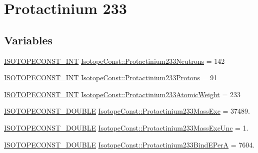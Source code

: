 \hypertarget{group___isotope_const-_protactinium-_pa233}{}\section{Protactinium 233}
\label{group___isotope_const-_protactinium-_pa233}
\subsection*{Variables}
\begin{DoxyCompactItemize}
\item 
\mbox{\hyperlink{group___isotope_const-_macros_ga5f18360b3e99483a35c32d789e62621c}{I\+S\+O\+T\+O\+P\+E\+C\+O\+N\+S\+T\+\_\+\+I\+NT}} \mbox{\hyperlink{group___isotope_const-_protactinium-_pa233_ga020b98acaa71450b29d8c4b69a46c08a}{Isotope\+Const\+::\+Protactinium233\+Neutrons}} = 142
\item 
\mbox{\hyperlink{group___isotope_const-_macros_ga5f18360b3e99483a35c32d789e62621c}{I\+S\+O\+T\+O\+P\+E\+C\+O\+N\+S\+T\+\_\+\+I\+NT}} \mbox{\hyperlink{group___isotope_const-_protactinium-_pa233_ga7b6be5bf425fa1b68cfed7db65f3fa11}{Isotope\+Const\+::\+Protactinium233\+Protons}} = 91
\item 
\mbox{\hyperlink{group___isotope_const-_macros_ga5f18360b3e99483a35c32d789e62621c}{I\+S\+O\+T\+O\+P\+E\+C\+O\+N\+S\+T\+\_\+\+I\+NT}} \mbox{\hyperlink{group___isotope_const-_protactinium-_pa233_ga519fa50211c0757804bed8f42f857d1c}{Isotope\+Const\+::\+Protactinium233\+Atomic\+Weight}} = 233
\item 
\mbox{\hyperlink{group___isotope_const-_macros_ga8f45a7272ce02c0b4c65c44636ed719a}{I\+S\+O\+T\+O\+P\+E\+C\+O\+N\+S\+T\+\_\+\+D\+O\+U\+B\+LE}} \mbox{\hyperlink{group___isotope_const-_protactinium-_pa233_gab168b6e6d94de212c546aee4f93c2f57}{Isotope\+Const\+::\+Protactinium233\+Mass\+Exc}} = 37489.
\item 
\mbox{\hyperlink{group___isotope_const-_macros_ga8f45a7272ce02c0b4c65c44636ed719a}{I\+S\+O\+T\+O\+P\+E\+C\+O\+N\+S\+T\+\_\+\+D\+O\+U\+B\+LE}} \mbox{\hyperlink{group___isotope_const-_protactinium-_pa233_gab8185b65672def55fa8daf3478d5b9ee}{Isotope\+Const\+::\+Protactinium233\+Mass\+Exc\+Unc}} = 1.
\item 
\mbox{\hyperlink{group___isotope_const-_macros_ga8f45a7272ce02c0b4c65c44636ed719a}{I\+S\+O\+T\+O\+P\+E\+C\+O\+N\+S\+T\+\_\+\+D\+O\+U\+B\+LE}} \mbox{\hyperlink{group___isotope_const-_protactinium-_pa233_gac435b470cad8e614c608e769676a1dcf}{Isotope\+Const\+::\+Protactinium233\+Bind\+E\+PerA}} = 7604.

\end{DoxyCompactItemize}
